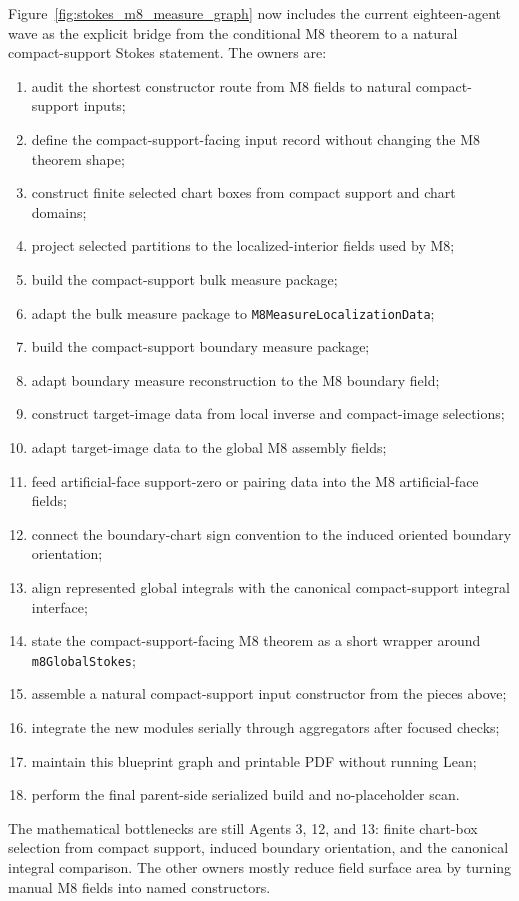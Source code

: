 \begin{proposition}
  \label{anc:m8_current_eighteen_agent_wave}
  \begingroup\raggedright
  Figure~\ref{fig:stokes_m8_measure_graph} now includes the current
  eighteen-agent wave as the explicit bridge from the conditional M8 theorem
  to a natural compact-support Stokes statement.  The owners are:
  \begin{enumerate}
    \item audit the shortest constructor route from M8 fields to natural
      compact-support inputs;
    \item define the compact-support-facing input record without changing the
      M8 theorem shape;
    \item construct finite selected chart boxes from compact support and chart
      domains;
    \item project selected partitions to the localized-interior fields used by
      M8;
    \item build the compact-support bulk measure package;
    \item adapt the bulk measure package to \texttt{M8MeasureLocalizationData};
    \item build the compact-support boundary measure package;
    \item adapt boundary measure reconstruction to the M8 boundary field;
    \item construct target-image data from local inverse and compact-image
      selections;
    \item adapt target-image data to the global M8 assembly fields;
    \item feed artificial-face support-zero or pairing data into the M8
      artificial-face fields;
    \item connect the boundary-chart sign convention to the induced oriented
      boundary orientation;
    \item align represented global integrals with the canonical compact-support
      integral interface;
    \item state the compact-support-facing M8 theorem as a short wrapper around
      \texttt{m8GlobalStokes};
    \item assemble a natural compact-support input constructor from the pieces
      above;
    \item integrate the new modules serially through aggregators after focused
      checks;
    \item maintain this blueprint graph and printable PDF without running Lean;
    \item perform the final parent-side serialized build and no-placeholder
      scan.
  \end{enumerate}
  The mathematical bottlenecks are still Agents 3, 12, and 13: finite chart-box
  selection from compact support, induced boundary orientation, and the
  canonical integral comparison.  The other owners mostly reduce field surface
  area by turning manual M8 fields into named constructors.
  \par\endgroup
\end{proposition}

